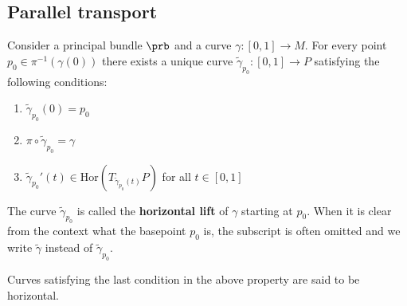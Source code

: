 \subsection{Parallel transport}

    \begin{definition}
        Consider a principal bundle $\prb$ and a curve $\gamma:[0, 1]\rightarrow M$. For every point $p_0\in \pi^{-1}(\gamma(0))$ there exists a unique curve $\widetilde{\gamma}_{p_0}:[0, 1]\rightarrow P$ satisfying the following conditions:
        \begin{enumerate}
            \item $\widetilde{\gamma}_{p_0}(0) = p_0$
            \item $\pi\circ\widetilde{\gamma}_{p_0} = \gamma$
            \item $\widetilde{\gamma}_{p_0}'(t)\in\text{Hor}(T_{\widetilde{\gamma}_{p_0}(t)}P)$ for all $t\in[0, 1]$
        \end{enumerate}
        The curve $\widetilde{\gamma}_{p_0}$ is called the \textbf{horizontal lift} of $\gamma$ starting at $p_0$. When it is clear from the context what the basepoint $p_0$ is, the subscript is often omitted and we write $\widetilde{\gamma}$ instead of $\widetilde{\gamma}_{p_0}$.
    \end{definition}
    \begin{remark}
        Curves satisfying the last condition in the above property are said to be horizontal.
    \end{remark}

